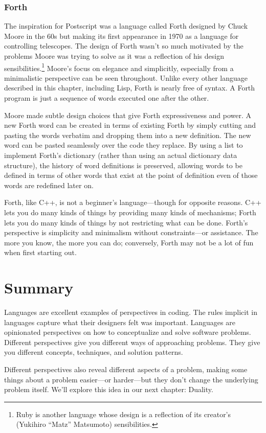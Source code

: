\subsubsection{Forth}

The inspiration for Postscript was a language called Forth designed by Chuck
Moore in the 60s but making its first appearance in 1970 as a language for
controlling telescopes. The design of Forth wasn't so much motivated by the
problems Moore was trying to solve as it was a reflection of his design
sensibilities.\footnote{Ruby is another language whose design is a reflection
of its creator's (Yukihiro ``Matz'' Matsumoto) sensibilities.} Moore's focus
on elegance and simplicitly, especially from a minimalistic perspective can be
seen throughout.  Unlike every other language described in this chapter,
including Lisp, Forth is nearly free of syntax. A Forth program is just a
sequence of words executed one after the other. 

Moore made subtle design choices that give Forth expressiveness and power.
A new Forth word can be created in terms of existing Forth by simply cutting
and pasting the words verbatim and dropping them into a new definition. The new
word can be pasted seamlessly over the code they replace. By using a list to
implement Forth's dictionary (rather than using an actual dictionary data
structure), the history of word definitions is preserved, allowing words to be
defined in terms of other words that exist at the point of definition even of
those words are redefined later on.

Forth, like C++, is not a beginner's language---though for opposite reasons.
C++ lets you do many kinds of things by providing many kinds of mechanisms;
Forth lets you do many kinds of things by not restricting what can be done.
Forth's perspective is simplicity and minimalism without constraints---or
assistance. The more you know, the more you can do; conversely, Forth may not
be a lot of fun when first starting out.

\section{Summary}

Languages are excellent examples of perspectives in coding. The rules implicit
in languages capture what their designers felt was important. Languages are
opinionated perspectives on how to conceptualize and solve software problems.
Different perspectives give you different ways of approaching problems. They
give you different concepts, techniques, and solution patterns.

Different perspectives also reveal different aspects of a problem, making some
things about a problem easier---or harder---but they don't change the
underlying problem itself. We'll explore this idea in our next chapter:
Duality.
